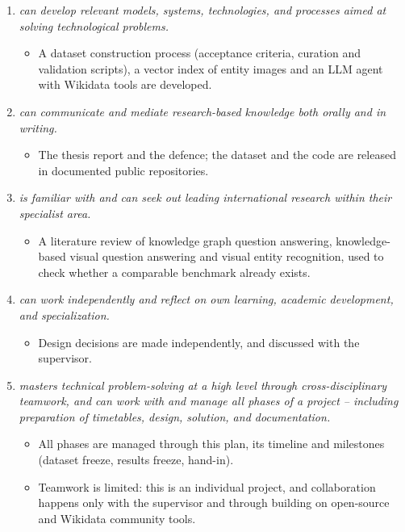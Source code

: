 \documentclass[a4paper,11pt]{article}
\begin{document}
\begin{enumerate}
\begin{itemize}
      \item Open-weight models on university hardware are used
        instead of commercial APIs, and the dataset uses openly licensed
        images with proper attribution.
    \end{itemize}
  \item \emph{can develop relevant models, systems, technologies, and
    processes aimed at solving technological problems.}
    \begin{itemize}
      \item A dataset construction process (acceptance criteria, curation and
        validation scripts), a vector index of entity images
        and an LLM agent with Wikidata tools are developed.
    \end{itemize}
  \item \emph{can communicate and mediate research-based knowledge both
    orally and in writing.}
    \begin{itemize}
      \item The thesis report and the defence; the dataset and the code are
        released in documented public repositories.
    \end{itemize}
  \item \emph{is familiar with and can seek out leading international
    research within their specialist area.}
    \begin{itemize}
      \item A literature review of knowledge graph question answering,
        knowledge-based visual question answering and visual entity
        recognition, used to check whether a comparable benchmark already
        exists.
    \end{itemize}
  \item \emph{can work independently and reflect on own learning, academic
    development, and specialization.}
    \begin{itemize}
      \item Design decisions are made independently, and discussed
        with the supervisor.
    \end{itemize}
  \item \emph{masters technical problem-solving at a high level through
      cross-disciplinary teamwork, and can work with and manage all phases of
      a project -- including preparation of timetables, design, solution, and
    documentation.}
    \begin{itemize}
      \item All phases are managed through this plan, its timeline and
        milestones (dataset freeze, results freeze, hand-in).
      \item Teamwork is limited: this is an individual project, and
        collaboration happens only with the supervisor and through building
        on open-source and Wikidata community tools.
    \end{itemize}
\end{enumerate}
\end{document}
